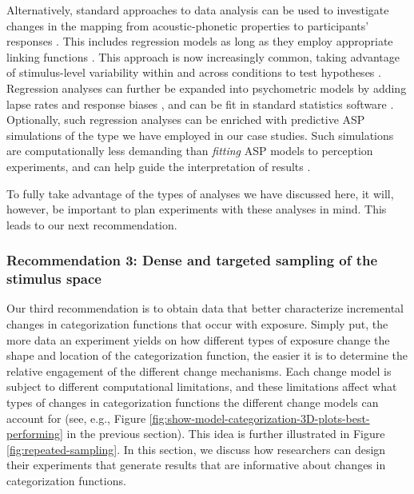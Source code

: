 \documentclass[
  11pt,
  man,floatsintext]{apa6}
\begin{document}
Alternatively, standard approaches to data analysis can be used to investigate changes in the mapping from acoustic-phonetic properties to participants' responses \autocite[for an excellent review, see][]{schertz-clare2020}. This includes regression models as long as they employ appropriate linking functions \autocites[e.g., logistic or multinomial regression for categorization,][]{jaeger2008,winter-wieling2016}. This approach is now increasingly common, taking advantage of stimulus-level variability within and across conditions to test hypotheses \autocites[e.g.,][]{clayards2018,idemaru-holt2020,schertz2015}. Regression analyses can further be expanded into psychometric models \autocite{wichmann-hill2001} by adding lapse rates and response biases \autocites[e.g.,][]{clayards2008,kleinschmidt2020}, and can be fit in standard statistics software \autocite[e.g., \texttt{brms},][]{burkner2017}. Optionally, such regression analyses can be enriched with predictive ASP simulations of the type we have employed in our case studies. Such simulations are computationally less demanding than \emph{fitting} ASP models to perception experiments, and can help guide the interpretation of results \autocites[for examples of approaches that mix predictive simulation with standard data analysis, see][]{bejjanki2011,clayards2008,hitczenko-feldman2016,tan2021,theodore-monto2019,xie2021cognition}[see also discussion in][]{bent-baeseberk2021}.

To fully take advantage of the types of analyses we have discussed here, it will, however, be important to plan experiments with these analyses in mind. This leads to our next recommendation.

\hypertarget{recommendation-3-dense-and-targeted-sampling-of-the-stimulus-space}{%
\subsubsection{Recommendation 3: Dense and targeted sampling of the stimulus space}\label{recommendation-3-dense-and-targeted-sampling-of-the-stimulus-space}}

Our third recommendation is to obtain data that better characterize incremental changes in categorization functions that occur with exposure. Simply put, the more data an experiment yields on how different types of exposure change the shape and location of the categorization function, the easier it is to determine the relative engagement of the different change mechanisms. Each change model is subject to different computational limitations, and these limitations affect what types of changes in categorization functions the different change models can account for (see, e.g., Figure \ref{fig:show-model-categorization-3D-plots-best-performing} in the previous section). This idea is further illustrated in Figure \ref{fig:repeated-sampling}. In this section, we discuss how researchers can design their experiments that generate results that are informative about changes in categorization functions.
\end{document}
